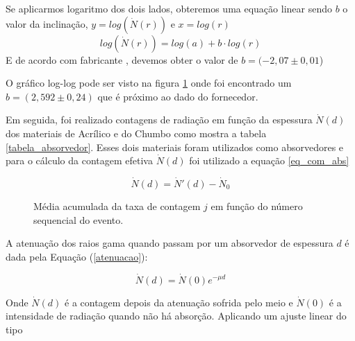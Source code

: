 \documentclass{article}
\begin{document}
Se aplicarmos logaritmo dos dois lados, obteremos uma equação linear sendo $b$ o valor da inclinação, $y=log(\dot N(r))$ e $ x = log(r)$ 
\begin{equation}
	log (\dot N(r)) = log(a) + b \cdot log(r)
\end{equation}
E de acordo com fabricante \cite{fisicaexpV}, devemos obter o valor de $b = (-2,07 \pm 0,01$)

O gráfico log-log pode ser visto na figura \ref{sem_abs} onde foi encontrado um $b = (2,592 \pm 0,24)$ que é próximo ao dado do fornecedor.

Em seguida, foi realizado contagens de radiação em função da espessura $\dot N(d)$ dos materiais de Acrílico e do Chumbo como mostra a tabela \ref{tabela_absorvedor}. Esses dois materiais foram utilizados como absorvedores e para o cálculo da contagem efetiva $\dot N(d)$ foi utilizado a equação \ref{eq_com_abs}

\begin{equation}
    \label{eq_com_abs}
    \dot N(d) = \dot N'(d) - \dot N _0
\end{equation}

\begin{figure}[H] %
    \centering
    \caption{Média acumulada da taxa de contagem $j$ em função do número sequencial do evento.}
    \label{sem_abs}
\end{figure}

A atenuação dos raios gama quando passam por um absorvedor de espessura $d$ é dada pela Equação (\ref{atenuacao}):

\begin{equation}
    \label{atenuacao}
    \dot N(d) = \dot N(0)e^{-\mu d}
\end{equation}

Onde $\dot N(d)$ é a contagem depois da atenuação sofrida pelo meio e $\dot N(0)$ é a intensidade de radiação quando não há absorção. Aplicando um ajuste linear do tipo
\end{document}
